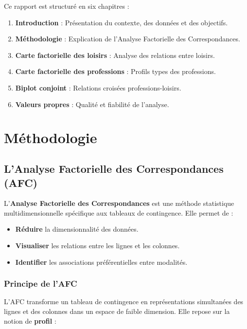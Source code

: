 \documentclass[12pt,a4paper]{book}
\begin{document}
	Ce rapport est structuré en six chapitres :
	
	\begin{enumerate}
		\item \textbf{Introduction} : Présentation du contexte, des données et des objectifs.
		\item \textbf{Méthodologie} : Explication de l'Analyse Factorielle des Correspondances.
		\item \textbf{Carte factorielle des loisirs} : Analyse des relations entre loisirs.
		\item \textbf{Carte factorielle des professions} : Profils types des professions.
		\item \textbf{Biplot conjoint} : Relations croisées professions-loisirs.
		\item \textbf{Valeurs propres} : Qualité et fiabilité de l'analyse.
	\end{enumerate}
	
	\chapter{Méthodologie}
	
	\section{L'Analyse Factorielle des Correspondances (AFC)}
	
	L'\textbf{Analyse Factorielle des Correspondances} est une méthode statistique multidimensionnelle spécifique aux tableaux de contingence. Elle permet de :
	
	\begin{itemize}
		\item \textbf{Réduire} la dimensionnalité des données.
		\item \textbf{Visualiser} les relations entre les lignes et les colonnes.
		\item \textbf{Identifier} les associations préférentielles entre modalités.
	\end{itemize}
	
	\subsection{Principe de l'AFC}
	
	L'AFC transforme un tableau de contingence en représentations simultanées des lignes et des colonnes dans un espace de faible dimension. Elle repose sur la notion de \textbf{profil} :
	
\end{document}

